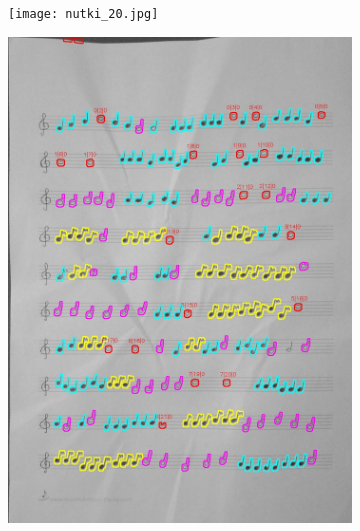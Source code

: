 \documentclass[11pt]{article}
\begin{document}
\begin{figure}[H]
    \centering
    \begin{subfigure}{.5\textwidth}
        \centering
        \graphicspath{ {Resources/} }
        \texttt{[image: nutki\_20.jpg]}
        \label{fig:sub1}
    \end{subfigure}%
    \begin{subfigure}{.5\textwidth}
        \centering
        \graphicspath{ {blobs/} }
        \includegraphics[width=\linewidth]{20_cnts.jpg}
        \label{fig:sub2}
    \end{subfigure}
    \label{fig:test}
\end{figure}
\end{document}
